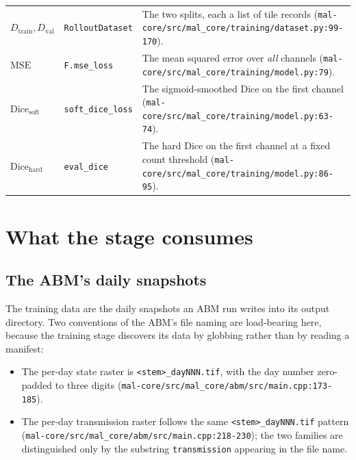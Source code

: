 \documentclass[11pt,a4paper]{article}
\newcommand{\codex}[1]{\texttt{#1}}
\begin{document}
\begin{center}
\begin{longtable}{@{}lp{3.4cm}p{9.0cm}@{}}
\(D_\mathrm{train}, D_\mathrm{val}\) & \codex{RolloutDataset} & The two splits, each a list of tile records (\codex{mal-core/\allowbreak{}src/\allowbreak{}mal\_\allowbreak{}core/\allowbreak{}training/\allowbreak{}dataset.py:99-170}). \\
\(\mathrm{MSE}\) & \codex{F.mse\_\allowbreak{}loss} & The mean squared error over \emph{all} channels (\codex{mal-core/\allowbreak{}src/\allowbreak{}mal\_\allowbreak{}core/\allowbreak{}training/\allowbreak{}model.py:79}). \\
\(\mathrm{Dice}_{\mathrm{soft}}\) & \codex{soft\_\allowbreak{}dice\_\allowbreak{}loss} & The sigmoid-smoothed Dice on the first channel (\codex{mal-core/\allowbreak{}src/\allowbreak{}mal\_\allowbreak{}core/\allowbreak{}training/\allowbreak{}model.py:63-74}). \\
\(\mathrm{Dice}_{\mathrm{hard}}\) & \codex{eval\_\allowbreak{}dice} & The hard Dice on the first channel at a fixed count threshold (\codex{mal-core/\allowbreak{}src/\allowbreak{}mal\_\allowbreak{}core/\allowbreak{}training/\allowbreak{}model.py:86-95}). \\
\bottomrule
\end{longtable}
\end{center}

\section{What the stage consumes}
\label{sec:consumes}

\subsection{The ABM's daily snapshots}

The training data are the daily snapshots an ABM run writes into its output
directory. Two conventions of the ABM's file naming are load-bearing here,
because the training stage discovers its data by globbing rather than by
reading a manifest:

\begin{itemize}
\item The per-day state raster is \codex{<stem>\_\allowbreak{}dayNNN.tif}, with the day
      number zero-padded to three digits
      (\codex{mal-core/\allowbreak{}src/\allowbreak{}mal\_\allowbreak{}core/\allowbreak{}abm/\allowbreak{}src/\allowbreak{}main.cpp:173-185}).
\item The per-day transmission raster follows the same
      \codex{<stem>\_\allowbreak{}dayNNN.tif} pattern
      (\codex{mal-core/\allowbreak{}src/\allowbreak{}mal\_\allowbreak{}core/\allowbreak{}abm/\allowbreak{}src/\allowbreak{}main.cpp:218-230}); the two
      families are distinguished only by the substring
      \codex{transmission} appearing in the file name.
\end{itemize}
\end{document}
